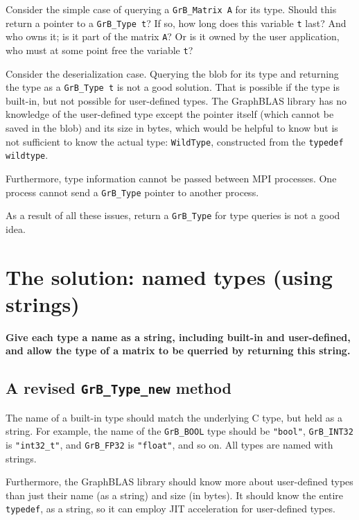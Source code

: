 \documentclass[12pt]{article}
\begin{document}
Consider the simple case of querying a \verb'GrB_Matrix A' for its type.
Should this return a pointer to a \verb'GrB_Type t'?  If so, how long does this
variable \verb't' last?  And who owns it; is it part of the matrix
\verb'A'?  Or is it owned by the user application, who must at some point
free the variable \verb't'?

Consider the deserialization case.  Querying the blob for its type and
returning the type as a \verb'GrB_Type t' is not a good solution.  That is
possible if the type is built-in, but not possible for user-defined types.
The GraphBLAS library has no knowledge of the user-defined type except
the pointer itself (which cannot be saved in the blob) and its size in bytes,
which would be helpful to know but is not sufficient to know the actual
type: \verb'WildType', constructed from the \verb'typedef wildtype'.

Furthermore, type information cannot be passed between MPI processes.
One process cannot send a \verb'GrB_Type' pointer to another process.

As a result of all these issues, return a \verb'GrB_Type' for type queries
is not a good idea.

\section{The solution: named types (using strings)}

{\bf Give each type a name as a string, including built-in and user-defined,
and allow the type of a matrix to be querried by returning this string.}

\subsection{A revised {\tt GrB\_Type\_new} method}
\label{gxb_type_new}

The name of a built-in type should match the underlying C type, but held
as a string.  For example, the name of the \verb'GrB_BOOL' type should be
\verb'"bool"', \verb'GrB_INT32' is \verb'"int32_t"', and \verb'GrB_FP32' is
\verb'"float"', and so on.  All types are named with strings.

Furthermore, the GraphBLAS library should know more about user-defined
types than just their name (as a string) and size (in bytes).  It should
know the entire \verb'typedef', as a string, so it can employ JIT acceleration
for user-defined types.
\end{document}
